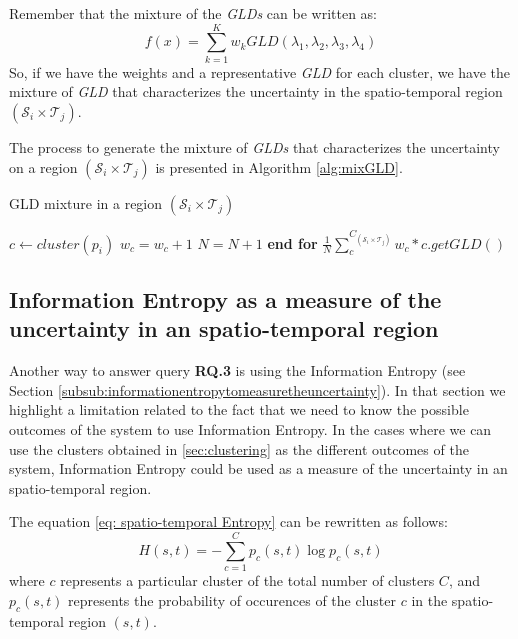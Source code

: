 Remember that the mixture of the \textit{GLDs} can be written as:
\begin{equation}
f(x)=\sum_{k=1}^K w_{k}GLD(\lambda_{1},\lambda_{2},\lambda_{3},\lambda_{4})
\end{equation}
So, if we have the weights and a representative \textit{GLD} for each cluster, we have the mixture of \textit{GLD} that characterizes the uncertainty in the spatio-temporal region $(\mathcal{S}_{i} \times \mathcal{T}_{j})$.

The process to generate the mixture of \textit{GLDs} that characterizes the uncertainty on a region $(\mathcal{S}_{i} \times \mathcal{T}_{j})$ is presented in Algorithm \ref{alg:mixGLD}.

\begin{algorithm} 
\caption{GLD mixture in a region $(\mathcal{S}_{i} \times \mathcal{T}_{j})$}\label{alg:mixGLD}
\begin{algorithmic}[1] 
\State $c \gets cluster(p_i)$
\State $w_c= w_c+1$
\State $N=N+1$
\EndFor
\State \textbf{end for}
\State \Return $\frac{1}{N} \sum_{c}^{C_{(\mathcal{S}_{i} \times \mathcal{T}_{j})}} 
    w_{c} * c.getGLD()$
\EndFunction 
\end{algorithmic} 
\end{algorithm} 

\subsection{Information Entropy as a measure of the uncertainty in an spatio-temporal region}
\label{sub:InfomationEntropyRegionWorkflow}
Another way to answer query \textbf{RQ.3} is using the Information Entropy (see Section \ref{subsub:informationentropytomeasuretheuncertainty}). In that section we highlight a limitation related to the fact that we need to know the possible outcomes of the system to use Information Entropy. In the cases where we can use the clusters  obtained in \ref{sec:clustering} as the different outcomes of the system, Information Entropy could be used as a measure of the uncertainty in an spatio-temporal region.
  
The equation \ref{eq: spatio-temporal Entropy} can be rewritten as follows:
\begin{equation}\label{eq: spatio-temporal EntropyWorkflow}
H(s,t)=-\sum_{c=1}^C p_{c}(s,t)\log p_{c}(s,t)
\end{equation}
where $c$ represents a particular cluster of the total number of clusters $C$, and $p_{c}(s,t)$ represents the probability of occurences of the cluster $c$ in the spatio-temporal region $(s,t)$.

